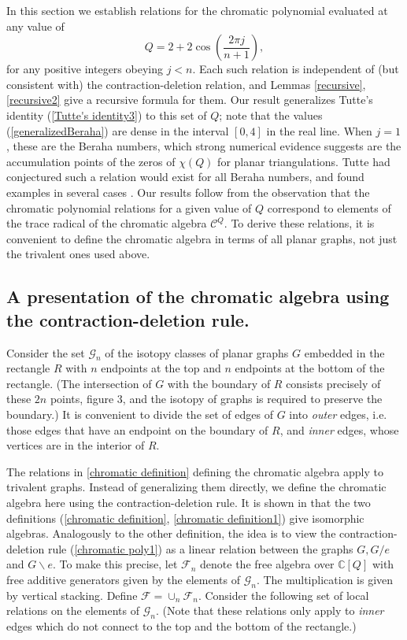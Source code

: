 \documentclass[11pt]{amsart}
\numberwithin{equation}{section}
\theoremstyle{definition}
\begin{document}
In this section we establish relations for the chromatic polynomial
evaluated at any value of
\begin{equation}  \label{generalizedBeraha}
Q=2+2\cos\left(\frac{2\pi j}{n+1}\right),
\end{equation}
for any positive integers obeying $j< n$. Each such relation is
independent of (but consistent with) the contraction-deletion
relation, and Lemmas \ref{recursive}, \ref{recursive2} give a
recursive formula for them. Our result generalizes Tutte's identity
(\ref{Tutte's identity3}) to this set of $Q$; note that the values
(\ref{generalizedBeraha}) are dense in the interval $[0,4]$ in the
real line. When $j=1$, these are the Beraha numbers, which strong
numerical evidence suggests are the accumulation points of the zeros
of $\chi(Q)$ for planar triangulations.  Tutte had conjectured such a
relation would exist for all Beraha numbers, and found examples in
several cases \cite{T3}. Our results follow from the observation that
the chromatic polynomial relations for a given value of $Q$ correspond
to elements of the trace radical of the chromatic algebra ${\mathcal
  C}^Q$.  To derive these relations, it is convenient to define the
chromatic algebra in terms of all planar graphs, not just the
trivalent ones used above.


\subsection{A presentation of the chromatic algebra using the
  contraction-deletion rule.}
Consider the set ${\mathcal G}_n$ of the isotopy classes
of planar graphs $G$ embedded in the rectangle $R$ with $n$ endpoints
at the top and $n$ endpoints at the bottom of the rectangle. (The
intersection of $G$ with the boundary of $R$ consists precisely of
these $2n$ points, figure 3, and the isotopy of graphs is required to preserve the boundary.)
It is convenient to divide the set of
edges of $G$ into {\em outer} edges, i.e. those edges that have an
endpoint on the boundary of $R$, and {\em inner} edges, whose vertices
are in the interior of $R$.

The relations in \ref{chromatic definition} defining the chromatic
algebra apply to trivalent graphs. Instead of generalizing them
directly, we define the chromatic algebra here using the
contraction-deletion rule. It is shown in \cite{FK} that the two
definitions (\ref{chromatic definition}, \ref{chromatic definition1})
give isomorphic algebras. Analogously to the other definition, the
idea is to view the contraction-deletion rule (\ref{chromatic poly1})
as a linear relation between the graphs $G, G/e$ and $G\backslash e$.
To make this precise, let ${\mathcal F}_n$ denote the free algebra
over ${\mathbb C}[Q]$ with free additive generators given by the
elements of ${\mathcal G}_n$.  The multiplication is given by vertical
stacking. Define ${\mathcal F}=\cup_n {\mathcal F}_n$.  Consider the
following set of local relations on the elements of ${\mathcal G}_n$.
(Note that these relations only apply to {\em inner} edges which do
not connect to the top and the bottom of the rectangle.)
\end{document}
